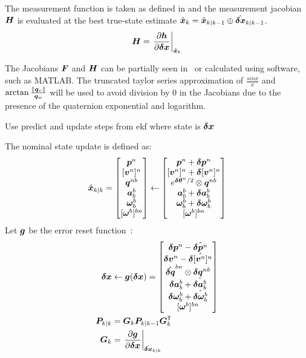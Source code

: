 The measurement function is taken as defined in  and the measurement jacobian $\bm{H}$ is evaluated at the best true-state estimate $\hat{\bm{x}}_k = \hat{\bm{x}}_{k \mid k-1} \oplus \hat{\bm \delta \bm x}_{k \mid k-1}$. 
%
\begin{align}
    \bm{H} = \left.\frac{\partial\bm h}{\partial\bm \delta \bm x}\right|_{\hat{\bm{x}}_k}
\end{align}

The Jacobians $\bm F$ and $\bm H$ can be partially seen in~\cite{Sol2017} or calculated using software, such as MATLAB.
The truncated taylor series approximation of $\frac{sinx}{x}$ and $\arctan \frac{\norm{ \bm q_v }}{\bm q_w}$ will be used to avoid division by $0$ in the Jacobians due to the presence of the quaternion exponential and logarithm.

Use predict and update steps from \gls{ekf} where state is $\bm \delta \bm x$

The nominal state update is defined as:
\begin{align}
    \hbx_{k \mid k} =
    \begin{bmatrix} 
        \m p^n \\
        [\m v^n]^n \\
        \q^{nb} \\
        \m a^b_b \\
        \m \omega^b_b \\
        [\m \omega^b]^{bn}
    \end{bmatrix} \gets
    \begin{bmatrix}
        \m p^n + \bd p^n \\
        [\m v^n]^n + \m \delta [\m v^n]^n \\
        e^{\bd \theta^n / 2}  \otimes \q^{nb} \\
        \m a^b_b + \bd a^b_b \\
        \m \omega^b_b + \bd \omega^b_b \\
        [\m \omega^b]^{bn}
    \end{bmatrix}
\end{align}
%
Let $\bm g$ be the error reset function~\cite{Sol2017}:
\begin{align}
    \bd x &\gets \fm g(\bd x) =
    \begin{bmatrix}
        \bd p^n - \hat{\bd p^n} \\
        \bd v^n - \hat{\m \delta [\m v^n]^n} \\
        \hat{\bd q}^{bn} \otimes \bd q^{nb} \\
        \bd a^b_b + \hat{\bd a^b_b} \\
        \bd \omega^b_b + \hat{\bd \omega^b_b} \\
        [\m \omega^b]^{bn}
    \end{bmatrix}\\
    \m{P}_{k \mid k} &= \m G_k \m P_{k \mid k-1} \m G _k\tran \\
    \m{G}_k &= \pjac{\fm g}{\bd x}{\hat{\bd x}_{k \mid k}}
\end{align}

